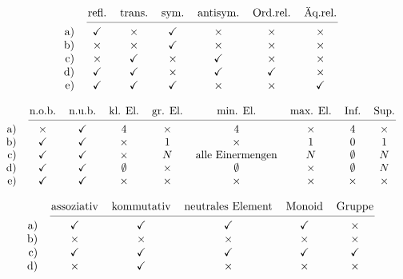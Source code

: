 \begin{loes} \quad
    \[ \begin{tabular}{rcccccc}
        & refl.  & trans. & sym. & antisym. & Ord.rel. & Äq.rel. \\
        \cmidrule(lr){2-7}
        a) & \checkmark & $\times$ & \checkmark & $\times$ & $\times$ & $\times$ \\
        b) & $\times$ & $\times$ & \checkmark & $\times$ & $\times$ & $\times$ \\
        c) & $\times$ & \checkmark & $\times$ & \checkmark & $\times$ & $\times$ \\
        d) & \checkmark & \checkmark & $\times$ & \checkmark & \checkmark & $\times$ \\
        e) & \checkmark & \checkmark & \checkmark & $\times$ & $\times$ & \checkmark
    \end{tabular} \]
\end{loes}


\begin{loes} \quad
    \[ \begin{tabular}{rcccccccc}
        & n.o.b.  & n.u.b. & kl. El. & gr. El. & min. El. & max. El. & Inf. & Sup. \\
        \cmidrule(lr){2-9}
        a) & $\times$ & \checkmark & $4$ & $\times$ & $4$ & $\times$ & $4$ & $\times$ \\
        b) & \checkmark & \checkmark & $\times$ & $1$ & $\times$ & $1$ & $0$ & $1$ \\
        c) & \checkmark & \checkmark & $\times$ & $\N$ & alle Einermengen & $\N$ & $\emptyset$ & $\N$ \\
        d) & \checkmark & \checkmark & $\emptyset$ & $\times$ & $\emptyset$ & $\times$ & $\emptyset$ & $\N$ \\
        e) & \checkmark & \checkmark & $\times$ & $\times$ & $\times$ & $\times$ & $\times$ & $\times$
    \end{tabular} \]
\end{loes}


\begin{loes} \quad
    \[ \begin{tabular}{rcccccc}
        & assoziativ  & kommutativ & neutrales Element & Monoid & Gruppe \\
        \cmidrule(lr){2-6}
        a) & \checkmark & \checkmark & \checkmark & \checkmark & $\times$ \\
        b) & $\times$ & $\times$ & $\times$ & $\times$ & $\times$ \\
        c) & \checkmark & \checkmark & \checkmark & \checkmark & \checkmark \\
        d) & $\times$ & \checkmark & $\times$ & $\times$ & $\times$
    \end{tabular} \]
\end{loes}


